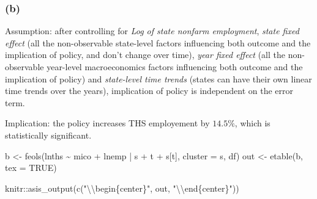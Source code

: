 \documentclass[
]{article}
\newenvironment{Shaded}{\begin{snugshade}}{\end{snugshade}}
\newcommand{\AttributeTok}[1]{\textcolor[rgb]{0.77,0.63,0.00}{#1}}
\newcommand{\ConstantTok}[1]{\textcolor[rgb]{0.00,0.00,0.00}{#1}}
\newcommand{\FunctionTok}[1]{\textcolor[rgb]{0.00,0.00,0.00}{#1}}
\newcommand{\NormalTok}[1]{#1}
\newcommand{\OtherTok}[1]{\textcolor[rgb]{0.56,0.35,0.01}{#1}}
\newcommand{\SpecialCharTok}[1]{\textcolor[rgb]{0.00,0.00,0.00}{#1}}
\newcommand{\StringTok}[1]{\textcolor[rgb]{0.31,0.60,0.02}{#1}}
\begin{document}
\hypertarget{b-2}{%
\subsubsection{(b)}\label{b-2}}

Assumption: after controlling for \emph{Log of state nonfarm
employment}, \emph{state fixed effect} (all the non-observable
state-level factors influencing both outcome and the implication of
policy, and don't change over time), \emph{year fixed effect} (all the
non-observable year-level macroeconomics factors influencing both
outcome and the implication of policy) and \emph{state-level time
trends} (states can have their own linear time trends over the years),
implication of policy is independent on the error term.

Implication: the policy increases THS employement by \(14.5\%\), which
is statistically significant.

\begin{Shaded}
\begin{Highlighting}[]
\NormalTok{b }\OtherTok{\textless{}{-}} \FunctionTok{feols}\NormalTok{(lnths }\SpecialCharTok{\textasciitilde{}}\NormalTok{ mico }\SpecialCharTok{+}\NormalTok{ lnemp }\SpecialCharTok{|}\NormalTok{ s }\SpecialCharTok{+}\NormalTok{ t }\SpecialCharTok{+}\NormalTok{ s[t], }\AttributeTok{cluster =} \StringTok{\textquotesingle{}s\textquotesingle{}}\NormalTok{, df)}
\NormalTok{out }\OtherTok{\textless{}{-}} \FunctionTok{etable}\NormalTok{(b, }\AttributeTok{tex =} \ConstantTok{TRUE}\NormalTok{) }
\end{Highlighting}
\end{Shaded}

\begin{Shaded}
\begin{Highlighting}[]
\NormalTok{knitr}\SpecialCharTok{::}\FunctionTok{asis\_output}\NormalTok{(}\FunctionTok{c}\NormalTok{(}\StringTok{"}\SpecialCharTok{\textbackslash{}\textbackslash{}}\StringTok{begin\{center\}"}\NormalTok{, out, }\StringTok{"}\SpecialCharTok{\textbackslash{}\textbackslash{}}\StringTok{end\{center\}"}\NormalTok{)) }
\end{Highlighting}
\end{Shaded}
\end{document}
